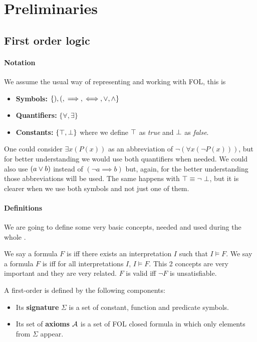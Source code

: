 \section{Preliminaries}

\subsection{First order logic}

\paragraph{Notation}
\label{def:notation}
We assume the usual way of representing and working with \gls{FOL}, this is
\begin{itemize}
	\item \textbf{Symbols:} $\{),(, \implies, \iff, \vee , \wedge \}$
	\item \textbf{Quantifiers:} $\{\forall, \exists\}$
	\item \textbf{Constants:} $\{\top,\perp\}$
	where we define $\top$ as \textit{true} and $\perp$ as \textit{false}.
\end{itemize}

One could consider $\exists x(P(x))$  as an abbreviation of $\neg (\forall x(\neg P(x)))$, but for better understanding we would use both quantifiers when needed.
We could also use $(a \vee b)$ instead of $(\neg a \implies b)$ but, again, for the better understanding those abbreviations will be used.
The same happens with $\top \equiv \neg \perp$, but it is clearer when we use both symbols and not just one of them.


\paragraph{Definitions}

We are going to define some very basic concepts, needed and used during the whole \thisworkmp.

We say a formula $F$ is  \gls{iff} there exists an interpretation $I$ such that $I \vDash F$. 
%
We say a formula $F$ is  \gls{iff} for all interpretations $I$, $I\vDash F$.
\label{def:validity}
This 2 concepts are very important and they are very related. $F$ is valid \gls{iff} $\neg F$ is unsatisfiable. 


A first-order  is defined by the following components: 
\begin{itemize}
	\item Its \textbf{signature} $\Sigma$ is a set of constant, function and predicate symbols.
	\item Its set of \textbf{axioms} $\mathcal{A}$ is a set of \gls{FOL} closed formula in which only elements from $\Sigma$ appear.
\end{itemize}


